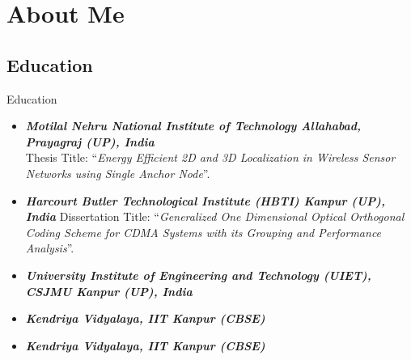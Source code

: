 \section{About Me}
\subsection{Education}
\begin{frame}{Education}{}
\small{
\begin{itemize}
\item {}  \newline\textbf{\textit{Motilal Nehru National Institute of Technology Allahabad, Prayagraj (UP), India}}\\Thesis Title: ``\emph{Energy Efficient 2D and 3D Localization in Wireless Sensor Networks using Single Anchor Node}''. 
\item {}\newline
\textbf{\textit{Harcourt Butler Technological Institute (HBTI) Kanpur (UP), India}}\newline
Dissertation Title: ``\emph{Generalized One Dimensional Optical Orthogonal Coding Scheme for CDMA Systems with its Grouping and Performance Analysis}''.
\item {}\newline
\textbf{\textit{University Institute of Engineering and Technology (UIET), CSJMU Kanpur (UP), India}} 
\item {}\newline
\textbf{\textit{Kendriya Vidyalaya, IIT Kanpur  (CBSE)}}%
\item {}\newline
\textbf{\textit{Kendriya Vidyalaya, IIT Kanpur (CBSE)}}%

\end{itemize}
}
\end{frame}


